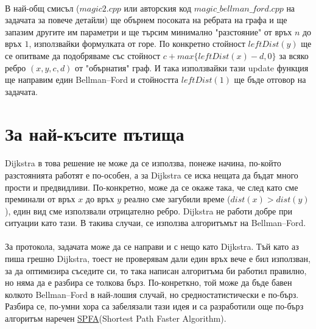 \documentclass[12pt]{article}
\begin{document}
\paragraph*{}
В най-общ смисъл ($magic2.cpp$ или авторския код $magic \_ bellman \_ ford.cpp$ на задачата за повече детайли) ще обърнем посоката на ребрата на графа и ще запазим другите им параметри и ще търсим минимално "разстояние" от връх $n$ до връх $1$, използвайки формулката от горе. По конкретно стойност $leftDist(y)$ ще се опитваме да подобряваме със стойност $c + max \{ leftDist(x) - d, 0 \}$ за всяко ребро $(x, y, c, d)$ от "обърнатия" граф. И така използвайки тази update функция ще направим един Bellman–Ford и стойността $leftDist(1)$ ще бъде отговор на задачата. 

\section*{За най-късите пътища}
\paragraph*{}
Dijkstra в това решение не може да се използва, понеже начина, по-който разстоянията работят е по-особен, а за Dijkstra се иска нещата да бъдат много прости и предвидливи. По-конкретно, може да се окаже така, че след като сме преминали от връх $x$ до връх $y$ реално сме загубили време ($dist(x) > dist(y)$), един вид сме използвали отрицателно ребро. Dijkstra не работи добре при ситуации като тази. В такива случаи, се използва алгоритъмът на Bellman–Ford.          
\paragraph*{}
За протокола, задачата може да се направи и с нещо като Dijkstra. Тъй като аз пиша грешно Dijkstra, тоест не проверявам дали един връх вече е бил използван, за да оптимизира съседите си, то така написан алгоритъма би работил правилно, но няма да е разбира се толкова бърз. По-конреткно, той може да бъде бавен колкото Bellman–Ford в най-лошия случай, но средностатистически е по-бърз. Разбира се, по-умни хора са забелязали тази идея и са разработили още по-бърз алгоритъм наречен \href{https://en.wikipedia.org/wiki/Shortest_Path_Faster_Algorithm}{SPFA}(Shortest Path Faster Algorithm).
\end{document}
